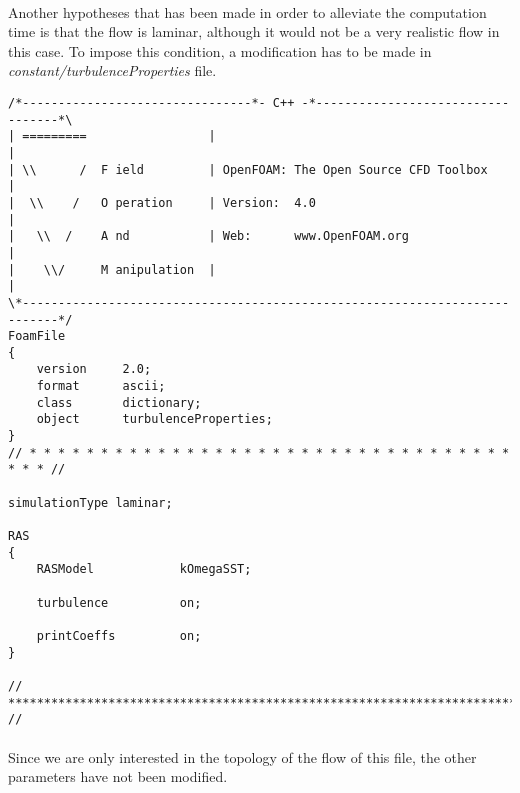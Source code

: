 \paragraph{}Another hypotheses that has been made in order to alleviate the computation time is that the flow is laminar, although it would not be a very realistic flow in this case. To impose this condition, a modification has to be made in \textit{constant/turbulenceProperties} file.


\begin{footnotesize}
\begin{verbatim}
/*--------------------------------*- C++ -*----------------------------------*\
| =========                 |                                                 |
| \\      /  F ield         | OpenFOAM: The Open Source CFD Toolbox           |
|  \\    /   O peration     | Version:  4.0                                   |
|   \\  /    A nd           | Web:      www.OpenFOAM.org                      |
|    \\/     M anipulation  |                                                 |
\*---------------------------------------------------------------------------*/
FoamFile
{
    version     2.0;
    format      ascii;
    class       dictionary;
    object      turbulenceProperties;
}
// * * * * * * * * * * * * * * * * * * * * * * * * * * * * * * * * * * * * * //

simulationType laminar;

RAS
{
    RASModel            kOmegaSST;

    turbulence          on;

    printCoeffs         on;
}

// ************************************************************************* //

\end{verbatim}
\end{footnotesize}

\paragraph{}Since we are only interested in the topology of the flow of this file, the other parameters have not been modified.